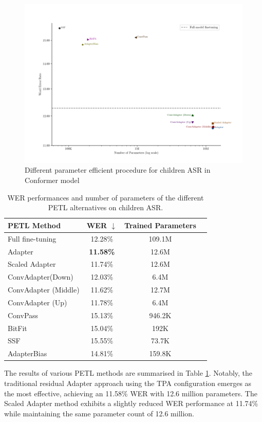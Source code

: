 \begin{figure}
    \begin{center}
        \includegraphics[width=\textwidth]{imgs/Adapter_compare_withoutWide.png}
        \caption{Different parameter efficient procedure for children ASR in Conformer model}
        \label{fig:adapter_compared_withoutWide}
    \end{center}
\end{figure}
\begin{table}
    \centering
    \begin{tabular}{lccc}
        \toprule
        \textbf{PETL Method} & \textbf{WER $\downarrow$} & \textbf{Trained Parameters} \\
        \midrule
        Full fine-tuning & 12.28\% & 109.1M \\ \hline
        Adapter & \textbf{11.58\%} & 12.6M \\
        Scaled Adapter & 11.74\% & 12.6M \\
        ConvAdapter(Down) & 12.03\% & 6.4M \\
        ConvAdapter (Middle) & 11.62\% & 12.7M \\
        ConvAdapter (Up) & 11.78\% & 6.4M \\
        ConvPass & 15.13\% & 946.2K \\
        BitFit & 15.04\% & 192K \\
        SSF & 15.55\% & 73.7K \\
        AdapterBias & 14.81\% & 159.8K \\
        \bottomrule
    \end{tabular}
    \caption{WER performances and number of parameters of the different PETL alternatives on children ASR.}
    \label{tab:PETL_alternatives}
\end{table}
The results of various \ac{PETL} methods are summarised in Table \ref{tab:PETL_alternatives}. Notably, the traditional residual Adapter approach using the \ac{TPA} configuration emerges as the most effective, achieving an 11.58\% \ac{WER} with 12.6 million parameters. The Scaled Adapter method exhibits a slightly reduced \ac{WER} performance at 11.74\% while maintaining the same parameter count of 12.6 million.

